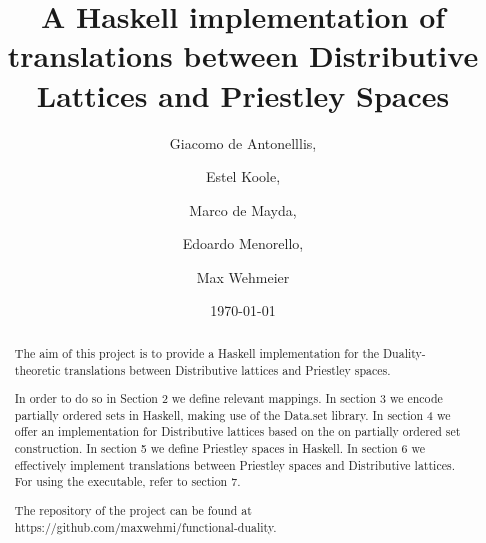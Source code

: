 \documentclass[12pt,a4paper]{article}
\title{A Haskell implementation of translations between Distributive Lattices and Priestley Spaces}
\author{Giacomo de Antonelllis, \and Estel Koole, \and Marco de Mayda, \and  Edoardo Menorello, \and  Max Wehmeier}
\date{\today}
\begin{document}
\maketitle

\begin{abstract}

The aim of this project is to provide a Haskell implementation for the Duality-theoretic translations between Distributive lattices and Priestley spaces.

In order to do so in Section 2 we define relevant mappings. In section 3 we encode partially ordered sets in Haskell, making use of the Data.set library. In section 4 we offer an implementation for Distributive lattices based on the on partially ordered set construction. In section 5 we define Priestley spaces in Haskell. In section 6 we effectively implement translations between Priestley spaces and Distributive lattices. For using the executable, refer to section 7.


The repository of the project can be found at https://github.com/maxwehmi/functional-duality.
\end{abstract}

\setcounter{tocdepth}{2} 
\tableofcontents

\clearpage


























\end{document}
